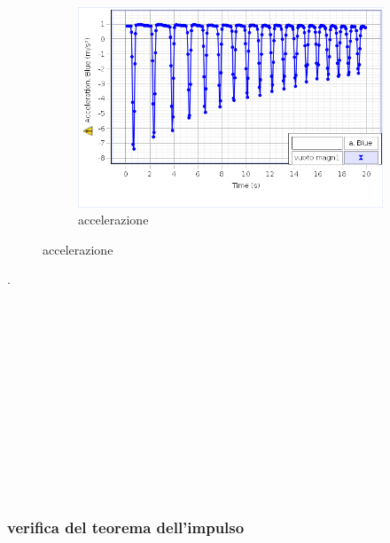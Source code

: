 \documentclass[a4paper]{article}
\theoremstyle{definition}
\begin{document}
\begin{figure}[!htbp]
{{			\begin{subfigure}{1.4\textwidth}
				\caption{accelerazione}
				\includegraphics[scale=1.2]{capstone_data/magn_1_acc.png}
			\end{subfigure}%
		}
	}
\end{figure}
.\\\\\\\\\\\\\\\\\\\\\\\\\\
\subsubsection*{verifica del teorema dell'impulso}
\end{document}
